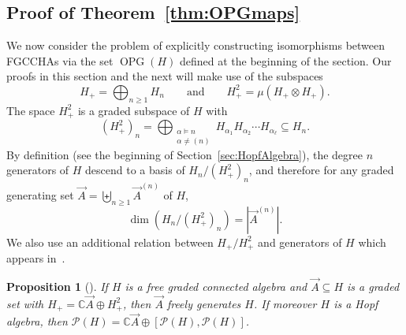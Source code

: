 \documentclass[11pt]{amsart}
\newtheorem{proposition}[theorem]{Proposition}
\theoremstyle{definition}
\numberwithin{equation}{section}
\def\CC{{\mathbb C}}
\newcommand{\FGCCHAs}{\textsf{FGCCHA}s\xspace}
\newcommand{\OPG}{\operatorname{OPG}}
\begin{document}
\subsection{Proof of Theorem~\ref{thm:OPGmaps}}
\label{sec:OPGproof}

We now consider the problem of explicitly constructing isomorphisms between \FGCCHAs via the set $\OPG(H)$ defined at the beginning of the section.  Our proofs in this section and the next will make use of the subspaces
\[
H_{+} = \bigoplus_{n \geq 1} H_n
\qquad\text{and}\qquad 
H^{2}_{+} = \mu(H_{+} \otimes H_{+}).
\]
The space $H^{2}_{+}$ is a graded subspace of $H$ with
\begin{equation}
\label{eq:Hplusdef}
(H^{2}_{+})_{n} = \bigoplus_{\substack{\alpha \vDash n \\ \alpha \neq (n)}}
H_{\alpha_{1}} H_{\alpha_{2}}\cdots H_{\alpha_{\ell}} \subseteq H_{n}.
\end{equation}
By definition (see the beginning of Section~\ref{sec:HopfAlgebra}), the degree $n$ generators of $H$ descend to a basis of $H_{n}/ (H^{2}_{+})_{n}$, and therefore for any graded generating set $\vec{A} = \biguplus_{n \ge 1} \vec{A}^{(n)}$ of $H$, 
\[
\dim(H_{n}/(H^{2}_{+})_{n}) = |\vec{A}^{(n)}|.
\]
We also use an additional relation between $H_{+}/H^{2}_{+}$ and generators of $H$ which appears in~\cite{F23}.

\begin{proposition}[{\cite[Proposition 2.2 and 2.4]{F23}}]
\label{prop:indecomposable generators}
If $H$ is a free graded connected algebra and $\vec{A} \subseteq H$ is a graded set with $H_{+} = \CC \vec{A} \oplus H_{+}^{2}$, then $\vec{A}$ freely generates $H$.  If moreover $H$ is a Hopf algebra, then $\mathcal{P}(H) = \CC \vec{A} \oplus [\mathcal{P}(H), \mathcal{P}(H)]$.
\end{proposition}
\end{document}
